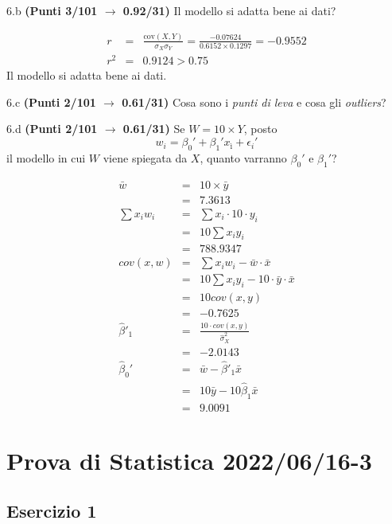 \documentclass[
  11pt,
]{book}
\theoremstyle{mytheoremstyle}
\theoremstyle{mydefstyle}
\newenvironment{sol}
  {
  \begin{tcolorbox}[enhanced,breakable,arc=0.1mm,boxrule=1pt,colback=white,colframe=iblue,
  title=\bf \fontfamily{lmss}\selectfont \hspace{.5 cm} Soluzione,drop fuzzy shadow]

}{
\end{tcolorbox}
  }
\begin{document}
6.b \textbf{(Punti 3/101 \(\rightarrow\) 0.92/31)} Il modello si adatta bene ai dati?

\begin{sol}
\begin{eqnarray*}
r&=&\frac{\text{cov}(X,Y)}{\sigma_X\sigma_Y}=\frac{ -0.07624 }{ 0.6152 \times 0.1297 }= -0.9552 \\r^2&=& 0.9124 > 0.75
\end{eqnarray*}
Il modello si adatta bene ai dati.

\end{sol}

6.c \textbf{(Punti 2/101 \(\rightarrow\) 0.61/31)} Cosa sono i \emph{punti di leva} e cosa gli \emph{outliers}?

6.d \textbf{(Punti 2/101 \(\rightarrow\) 0.61/31)} Se \(W=10\times Y\), posto
\[w_i=\beta_0'+\beta_1'x_ì +\epsilon_i'\]
il modello in cui \(W\) viene spiegata da \(X\), quanto varranno \(\beta_0'\) e \(\beta_1'\)?

\begin{sol}
\begin{eqnarray*}
  \bar w &=& 10\times \bar y\\
  &=& 7.3613\\
  \sum x_iw_i&=&\sum x_i\cdot 10\cdot y_i\\
  &=& 10\sum x_i y_i\\
  &=& 788.9347\\
  cov(x,w)&=&\sum x_iw_i-\bar w\cdot\bar x\\
  &=&10\sum x_i y_i - 10 \cdot\bar y\cdot\bar x\\
  &=&10 cov(x,y)\\
  &=& -0.7625\\
  \hat\beta'_1&=&\frac{10\cdot cov(x,y)}{\hat\sigma_X^2}\\
  &=&-2.0143\\
  \hat\beta_0'&=& \bar w -\hat\beta'_1\bar x\\
  &=&10\bar y - 10 \hat \beta_1\bar x\\
  &=&9.0091
\end{eqnarray*}

\end{sol}

\section{Prova di Statistica 2022/06/16-3}\label{prova-di-statistica-20220616-3}

\subsection{Esercizio 1}\label{esercizio-1-13}
\end{document}
